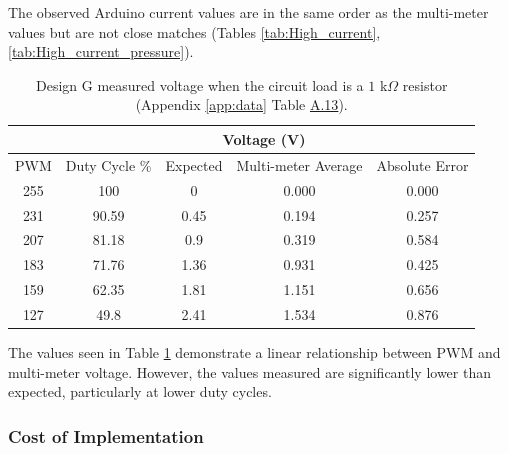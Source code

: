 The observed Arduino current values are in the same order as the multi-meter values but are not close matches (Tables \ref{tab:High_current}, \ref{tab:High_current_pressure}).

\begin{table}[H]
    \centering
    \caption[Design G: Voltage Measurements \(1\) k\(\Omega\) Resistor Load]{Design G measured voltage when the circuit load is a \(1\) k\(\Omega\) resistor (Appendix \ref{app:data} Table \hyperref[tab:A.13]{A.13}).}
    \label{tab:high_voltage_1k}
    \begin{tabular}{|c|c||c|c||c|}\hline
     &&\multicolumn{2}{|c||}{Voltage (V)} &  \\\hline
    PWM &Duty Cycle \%&Expected&Multi-meter Average&Absolute Error \\ \hline 
    255&100&0&0.000&0.000\\ \hline
    231&90.59&0.45&0.194&0.257\\\hline
    207&81.18&0.9&0.319&0.584\\\hline
    183&71.76&1.36&0.931&0.425\\\hline
    159&62.35&1.81&1.151&0.656\\\hline
 127& 49.8& 2.41& 1.534&0.876\\\hline\end{tabular}  
\end{table}

The values seen in Table \ref{tab:high_voltage_1k} demonstrate a linear relationship between PWM and multi-meter voltage. However, the values measured are significantly lower than expected, particularly at lower duty cycles.


\subsubsection{Cost of Implementation}

